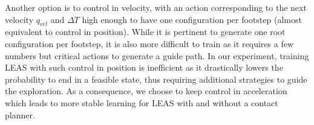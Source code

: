 Another option is to control in velocity, with an action corresponding to the next velocity $q_{vel}$ and $\Delta T$ high enough to have one configuration per footstep (almost equivalent to control in position).
While it is pertinent to generate one root configuration per footstep, it is also more difficult to train as it requires a few numbers but critical actions to generate a guide path. 
In our experiment, training LEAS with such control in position is inefficient as it drastically lowers the probability to end in a feasible state, thus requiring additional strategies to guide the exploration.
As a consequence, we choose to keep control in acceleration which leads to more stable learning for LEAS with and without a contact planner.

